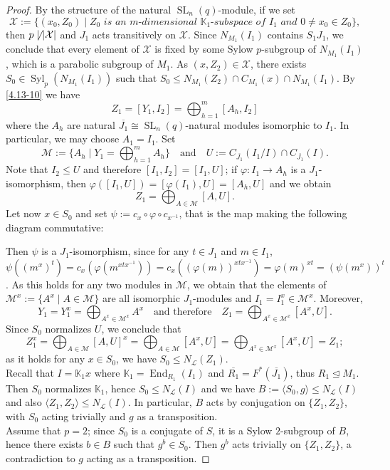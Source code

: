 \documentclass{amsart}
\numberwithin{equation}{section}
\theoremstyle{definition}
\theoremstyle{subresult}
\theoremstyle{caseresult}
\renewcommand{\phi}{\varphi}
\newcommand{\bK}{\mathbb{K}}
\newcommand{\M}{\mathcal{M}}
\renewcommand{\L}{\mathcal{L}}
\newcommand{\End}{\operatorname{End}}
\newcommand{\Syl}{\operatorname{Syl}}
\newcommand{\SL}{\operatorname{SL}}
\newcommand{\ov}{\overline}
\newcommand{\norm}{\trianglelefteq}
\newcommand{\inv}{^{-1}}
\newcommand{\fto}{\longrightarrow}
\newcommand{\<}{\langle}
\renewcommand{\>}{\rangle}
\begin{document}
\begin{proof}
	By the structure of the natural $\SL_n(q)$-module, if we set
	\[
	\mathcal{X} := \{(x_0,Z_0) \mid \textit{$Z_0$ is an $m$-dimensional $\bK_1$-subspace of $I_1$ and $0 \ne x_0 \in Z_0$}\},
	\]
	then $	p \not \mid |\mathcal{X}|$ and $J_1$ acts transitively on $\mathcal{X}$. Since $N_{M_1}(I_1)$ contains $S_1J_1$, we conclude that every element of $\mathcal{X}$ is fixed by some Sylow $p$-subgroup of $N_{M_1}(I_1)$, which is a parabolic subgroup of $M_1$. As $(x,Z_2) \in \mathcal{X}$, there exists $S_0 \in \Syl_p(N_{M_1}(I_1))$ such that $S_0 \le N_{M_1}(Z_2) \cap C_{M_1}(x) \cap N_{M_1}(I_1)$. By \eqref{4.13-10} we have
	\[
	Z_1 = [Y_1,I_2] = \bigoplus_{h=1}^m [A_h,I_2]
	\]
	where the $A_h$ are natural $\ov{J_1} \cong \SL_n(q)$-natural modules isomorphic to $I_1$. In particular, we may choose $A_1=I_1$. Set
	\[
	\M := \{A_h \mid Y_1=\bigoplus_{h=1}^m A_h\} \quad \text{and} \quad U:= C_{\ov{J_1}}(I_1 / I) \cap C_{\ov{J_1}}(I).
	\]
	Note that $I_2 \le U$ and therefore $ [I_1,I_2]=[I_1,U]$; if $\phi: I_1 \fto A_h$ is a $J_1$-isomorphism, then $\phi([I_1,U]) = [\phi(I_1),U] =[A_h,U]$ and we obtain
	\[
	Z_1 = \bigoplus_{A \in \M} [A,U].
	\]
	Let now $x \in S_0$ and set $\psi:= c_{x} \circ \phi \circ c_{x\inv}$, that is the map making the following diagram commutative:
	\begin{center}
	\end{center}
	Then $\psi$ is a $J_1$-isomorphism, since for any $t \in J_1$ and $m \in I_1$, $\psi((m^x)^t) = c_x(\phi(m^{xtx\inv})) = c_x((\phi(m))^{xtx\inv}) = \phi(m)^{xt} = (\psi(m^x))^t$. As this holds for any two modules in $\M$, we obtain that the elements of $\M^x:=\{A^x \mid A \in \M\}$ are all isomorphic $J_1$-modules and $I_1 = I_1^x \in \M^x$. Moreover,
	\[
	Y_1 = Y_1^x =\bigoplus_{A^x \in \M^x} A^x \quad \text{and therefore} \quad Z_1 = \bigoplus_{A^x \in \M^x} [A^x,U].
	\]
	Since $S_0$ normalizes $U$, we conclude that 
	\[
	Z_1^x = \bigoplus_{A \in \M} [A,U]^x = \bigoplus_{A \in \M} [A^x,U] = \bigoplus_{A^x \in \M^x} [A^x,U] = Z_1;
	\]
	as it holds for any $x \in S_0$, we have $S_0 \le N_\L(Z_1)$.\\
	Recall that $I=\bK_1 x$ where $\bK_1 = \End_{R_1}(I_1)$ and $\ov{R_1} = F^*(\ov{J_1})$, thus $R_1 \norm M_1$. Then $S_0$ normalizes $\bK_1$, hence $S_0 \le N_\L(I)$ and we have $B:= \< S_0,g \> \le N_\L(I)$ and also $\<Z_1,Z_2\> \le N_\L(I)$. In particular, $B$ acts by conjugation on $\{Z_1,Z_2\}$, with $S_0$ acting trivially and $g$ as a transposition.\\
	
	Assume that $p=2$; since $S_0$ is a conjugate of $S$, it is a Sylow $2$-subgroup of $B$, hence there exists $b \in B$ such that $g^b \in S_0$. Then $g^b$ acts trivially on $\{Z_1,Z_2\}$, a contradiction to $g$ acting as a transposition.
\end{proof}
\end{document}
